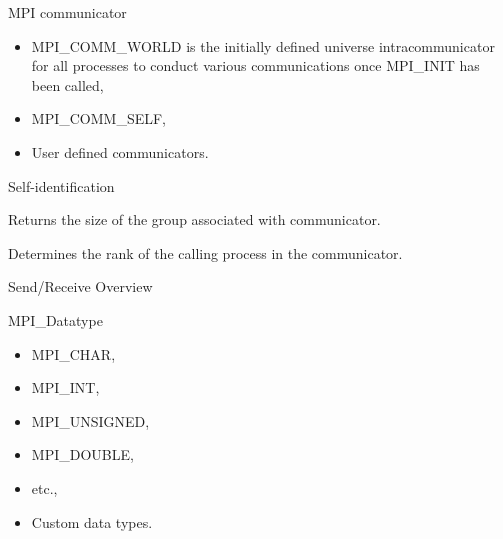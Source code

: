 \documentclass{beamer}
\begin{document}


\begin{frame}{MPI communicator}

\begin{itemize}
	\item MPI_COMM_WORLD is the initially defined universe intracommunicator for all processes to conduct various communications once MPI_INIT has been called,
	\item MPI_COMM_SELF,
	\item User defined communicators.
\end{itemize}

\end{frame}

\begin{frame}{Self-identification}

\size

Returns the size of the group associated with communicator.

\vfill

\rank

Determines the rank of the calling process in the communicator.

\end{frame}


\begin{frame}{Send/Receive Overview}

\sendrecv

\end{frame}

\begin{frame}{MPI_Datatype}

\begin{itemize}
	\item MPI_CHAR,
	\item MPI_INT,
	\item MPI_UNSIGNED,
	\item MPI_DOUBLE,
	\item etc.,
	\item Custom data types.
\end{itemize}

\end{frame}
\end{document}
